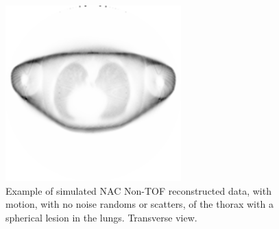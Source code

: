                 \begin{figure}
                    \centering
                    
                    \includegraphics[width=1.0\linewidth]{figures/background_nAC_example.png}
                    
                    \captionsetup{singlelinecheck=false}
                    \caption{
                        Example of simulated \gls{NAC} \gls{Non-TOF} reconstructed data, with motion, with no noise randoms or scatters, of the thorax with a spherical lesion in the lungs. Transverse view.
                    }
                    \label{fig:combined_pet_ct_nac_tof_example}
                \end{figure}
                
